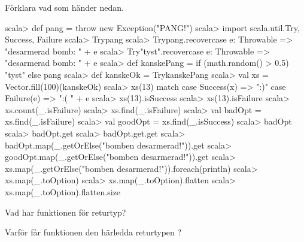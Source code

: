 \Subtask Förklara vad som händer nedan.
\begin{REPL}
scala> def pang = throw new Exception("PANG!")
scala> import scala.util.{Try, Success, Failure}
scala> Try{pang}
scala> Try{pang}.recover{case e: Throwable =>   "desarmerad bomb: " + e}
scala> Try{"tyst"}.recover{case e: Throwable => "desarmerad bomb: " + e}
scala> def kanskePang = if (math.random() > 0.5) "tyst" else pang
scala> def kanskeOk = Try{kanskePang}
scala> val xs = Vector.fill(100)(kanskeOk)
scala> xs(13) match
         case Success(x) => ":)"
         case Failure(e) => ":( " + e
scala> xs(13).isSuccess
scala> xs(13).isFailure
scala> xs.count(_.isFailure)
scala> xs.find(_.isFailure)
scala> val badOpt = xs.find(_.isFailure)
scala> val goodOpt = xs.find(_.isSuccess)
scala> badOpt
scala> badOpt.get
scala> badOpt.get.get
scala> badOpt.map(_.getOrElse("bomben desarmerad!")).get
scala> goodOpt.map(_.getOrElse("bomben desarmerad!")).get
scala> xs.map(_.getOrElse("bomben desarmerad!")).foreach(println)
scala> xs.map(_.toOption)
scala> xs.map(_.toOption).flatten
scala> xs.map(_.toOption).flatten.size
\end{REPL}


\Subtask Vad har funktionen  för returtyp?

\Subtask Varför får funktionen  den härledda returtypen ?

\SOLUTION


\TaskSolved \what


